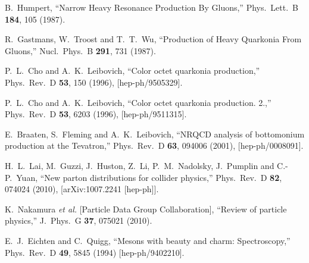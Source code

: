 \documentclass[aps,prc,preprint,superscriptaddress,showpacs,showkeys,amsmath]{revtex4-1}
\begin{document}
\begin{thebibliography}{100}
  B.~Humpert,
  ``Narrow Heavy Resonance Production By Gluons,''
  Phys.\ Lett.\ B {\bf 184}, 105 (1987).


  R.~Gastmans, W.~Troost and T.~T.~Wu,
  ``Production of Heavy Quarkonia From Gluons,''
  Nucl.\ Phys.\ B {\bf 291}, 731 (1987).


  P.~L.~Cho and A.~K.~Leibovich,
  ``Color octet quarkonia production,''
  Phys.\ Rev.\ D {\bf 53}, 150 (1996),
  [hep-ph/9505329].

  P.~L.~Cho and A.~K.~Leibovich,
  ``Color octet quarkonia production. 2.,''
  Phys.\ Rev.\ D {\bf 53}, 6203 (1996),
  [hep-ph/9511315].

  E.~Braaten, S.~Fleming and A.~K.~Leibovich,
  ``NRQCD analysis of bottomonium production at the Tevatron,''
  Phys.\ Rev.\ D {\bf 63}, 094006 (2001),
  [hep-ph/0008091].


  H.~L.~Lai, M.~Guzzi, J.~Huston, Z.~Li, P.~M.~Nadolsky, J.~Pumplin and C.-P.~Yuan,
  ``New parton distributions for collider physics,''
  Phys.\ Rev.\ D {\bf 82}, 074024 (2010),
  [arXiv:1007.2241 [hep-ph]].


  K.~Nakamura {\it et al.}  [Particle Data Group Collaboration],
  ``Review of particle physics,''
  J.\ Phys.\ G {\bf 37}, 075021 (2010).


  E.~J.~Eichten and C.~Quigg,
  ``Mesons with beauty and charm: Spectroscopy,''
  Phys.\ Rev.\ D {\bf 49}, 5845 (1994)
  [hep-ph/9402210].




 
 


\end{thebibliography}
\end{document}
